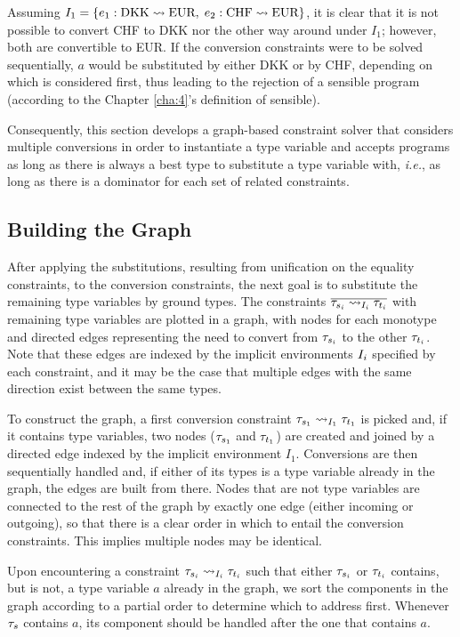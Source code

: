 Assuming $\imEnv_1 = \{e_1 : \text{DKK} \rightsquigarrow \text{EUR}, \;e_2 : \text{CHF} \rightsquigarrow \text{EUR}\}$, it is clear that it is not possible to convert CHF to DKK nor the other way around under $I_1$; however, both are convertible to EUR. If the conversion constraints were to be solved sequentially, $a$ would be substituted by either DKK or by CHF, depending on which is considered first, thus leading to the rejection of a sensible program (according to the Chapter \ref{cha:4}'s definition of sensible).

Consequently, this section develops a graph-based constraint solver that considers multiple conversions in order to instantiate a type variable and accepts programs as long as there is always a best type to substitute a type variable with, \textit{i.e.}, as long as there is a dominator for each set of related constraints.

\subsection{Building the Graph}
\label{graph}
After applying the substitutions, resulting from unification on the equality constraints, to the conversion constraints, the next goal is to substitute the remaining type variables by ground types. The constraints $\overline{\convX{\imEnv_i}{\type_{s_i}}{\type_{t_i}}}$ with remaining type variables are plotted in a graph, with nodes for each monotype and directed edges representing the need to convert from $\type_{s_i}$ to the other $\type_{t_i}$. Note that these edges are indexed by the implicit environments $\imEnv_i$ specified by each constraint, and it may be the case that multiple edges with the same direction exist between the same types.

To construct the graph, a first conversion constraint $\convX{\imEnv_1}{\type_{s_1}}{\type_{t_1}}$ is picked and, if it contains type variables, two nodes ($\type_{s_1}$ and $\type_{t_1}$) are created and joined by a directed edge indexed by the implicit environment $I_1$. Conversions are then sequentially handled and, if either of its types is a type variable already in the graph, the edges are built from there. Nodes that are not type variables are connected to the rest of the graph by exactly one edge (either incoming or outgoing), so that there is a clear order in which to entail the conversion constraints. This implies multiple nodes may be identical. 

Upon encountering a constraint $\convX{\imEnv_i}{\type_{s_i}}{\type_{t_i}}$ such that either $\type_{s_i}$ or $\type_{t_i}$ contains, but is not, a type variable $a$ already in the graph, we sort the components in the graph according to a partial order to determine which to address first. Whenever $\type_s$ contains $a$, its component should be handled after the one that contains $a$.

